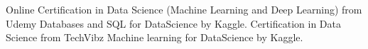 %
%
%


\renewcommand{\baselinestretch}{1.3}

\begin{scholarship}
					{Online Certification in Data Science (Machine Learning and Deep Learning) from Udemy}
					{Databases and SQL for DataScience by Kaggle.}
					{Certification in Data Science from TechVibz}
					{Machine learning for DataScience by Kaggle.}
\end{scholarship}\\
